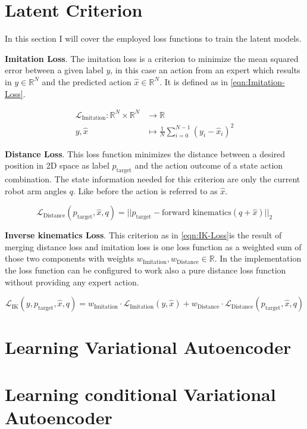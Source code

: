 \section{Latent Criterion}

In this section I will cover the employed loss functions to train the latent models. 


\textbf{Imitation Loss}. The imitation loss is a criterion to minimize the mean squared error between a given label $y$, in this case an action from an expert which results in $y \in \mathbb{R}^N$ and the predicted action $\hat{x} \in \mathbb{R}^N$. It is defined as in \eqref{eqn:Imitation-Loss}.

\begin{equation}[p]\label{eqn:Imitation-Loss}
    \begin{split}
        \mathcal{L}_\text{Imitation}: \mathbb{R}^N \times \mathbb{R}^N & \to \mathbb{R} \\
        y, \hat{x} & \mapsto \frac{1}{N}\sum_{i = 0}^{N-1} (y_i - \hat{x}_i)^2 
    \end{split}
\end{equation}


\textbf{Distance Loss}. This loss function minimizes the distance between a desired position in 2D space as label $p_\text{target}$ and the action outcome of a state action combination. The state information needed for this criterion are only the current robot arm angles $q$. Like before the action is referred to as $\hat{x}$. 

\begin{equation}[p]\label{eqn:Distance-Loss}
    \mathcal{L}_\text{Distance}(p_\text{target}, \hat{x}, q) = ||p_\text{target} - \text{forward kinematics}(q + \hat{x})||_2
\end{equation}

\textbf{Inverse kinematics Loss}. This criterion as in \eqref{eqn:IK-Loss}is the result of merging distance loss and imitation loss is one loss function as a weighted sum of those two components with weights $w_\text{Imitation}, w_\text{Distance} \in \mathbb{R}$. In the implementation the loss function can be configured to work also a pure distance loss function without providing any expert action.

\begin{equation}\label{eqn:IK-Loss}
    \mathcal{L}_\text{IK}(y, p_\text{target}, \hat{x}, q) = w_\text{Imitation} \cdot \mathcal{L}_\text{Imitation}(y, \hat{x}) + w_\text{Distance} \cdot \mathcal{L}_\text{Distance}(p_\text{target}, \hat{x}, q)
\end{equation}

\section{Learning Variational Autoencoder}

\subsection{}

\section{Learning conditional Variational Autoencoder}


